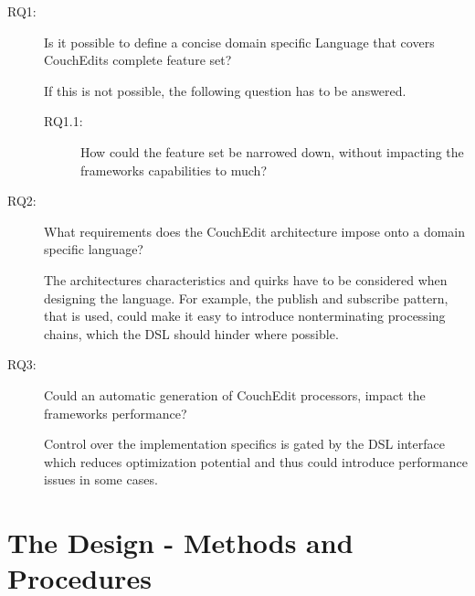 \documentclass[10pt,a4paper,oneside]{scrartcl}
\newcommand\hint[2]{
\ifthenelse{\boolean{showhints}}{
\begin{center}
\colorbox{black!10}{
\begin{minipage}{.963\textwidth}
#2\hfill\textbf{#1}
\end{minipage}
}\end{center}}{}
}
\begin{document}
\begin{description}
  \item[RQ1:] Is it possible to define a concise domain specific Language that covers CouchEdits complete feature set?

        If this is not possible, the following question has to be answered.
        \begin{description}
          \item[RQ1.1:] How could the feature set be narrowed down, without impacting the frameworks capabilities to much?
        \end{description}

  \item[RQ2:] What requirements does the CouchEdit architecture impose onto a domain specific language?

        The architectures characteristics and quirks have to be considered when designing the language. For example, the publish and subscribe pattern, that is used, could make it easy to introduce nonterminating processing chains, which the DSL should hinder where possible.

  \item[RQ3:] Could an automatic generation of CouchEdit processors, impact the frameworks performance?

        Control over the implementation specifics is gated by the DSL interface which reduces optimization potential and thus could introduce performance issues in some cases.
\end{description}

\section{The Design - Methods and Procedures}
\label{sec:approach}


\end{document}
